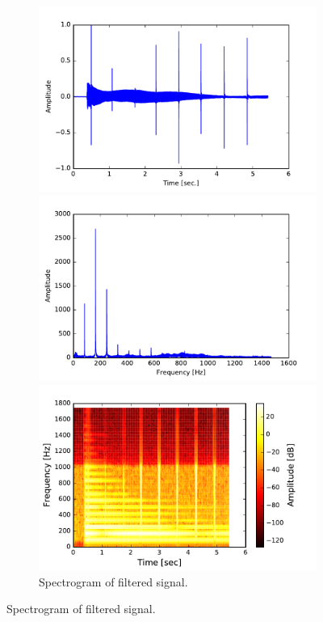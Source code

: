 \begin{figure}[H]
\centering
\begin{subfigure}{0.49\textwidth}
\centering
\includegraphics[width=\textwidth]{figures/validation/integration/signal.pdf}
\caption{Input signal with noise.}
\label{fig:inte_signal}

\includegraphics[width=\textwidth]{figures/validation/integration/f_signal.pdf}
\caption{Frequency spectrum of signal with noise.}
\label{fig:inte_SIGNAL}

\includegraphics[width=\textwidth]{figures/validation/integration/spectrogram.pdf}
\caption{Spectrogram of filtered signal.}
\label{fig:inte_spec}


\end{subfigure}
\end{figure}
